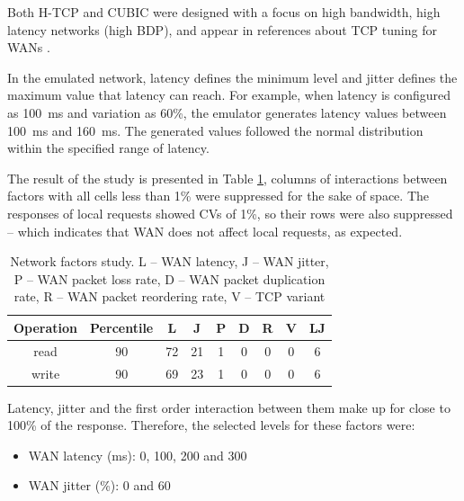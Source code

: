 \documentclass[doublespacing]{bmcart}
\begin{document}
Both H-TCP and CUBIC were designed with a focus on high bandwidth, high latency
networks (high BDP), and appear in references about TCP tuning for WANs
\cite{ESnet2012}.

In the emulated network, latency defines the minimum level and jitter defines
the maximum value that latency can reach. For example, when latency is
configured as 100~ms and variation as 60\%, the emulator generates latency
values between 100~ms and 160~ms. The generated values followed the normal
distribution within the specified range of latency.

The result of the study is presented in Table
\ref{tab:estudo_para_fatores_de_rede}, columns of interactions between factors
with all cells less than 1\% were suppressed for the sake of space. The
responses of local requests showed CVs of 1\%, so their rows were also
suppressed -- which indicates that WAN does not affect local requests, as
expected.

\begin{table}[h!]
\caption{Network factors study. L -- WAN latency, J -- WAN jitter, P -- WAN
packet loss rate, D -- WAN packet duplication rate, R -- WAN packet reordering
rate, V -- TCP variant}
\label{tab:estudo_para_fatores_de_rede}
\begin{tabular}{ccccccccc} \hline

Operation & Percentile & L & J & P & D & R & V & LJ\\\hline

read & 90 & 72 & 21 & 1 & 0 & 0 & 0 & 6\\

write & 90 & 69 & 23 & 1 & 0 & 0 & 0 & 6\\\hline

\end{tabular}

\end{table}

Latency, jitter and the first order interaction between them make up for close to 100\% of the response. Therefore, the selected levels for
these factors were:

\begin{itemize}

\item WAN latency (ms): 0, 100, 200 and 300

\item WAN jitter (\%): 0 and 60

\end{itemize}
\end{document}
